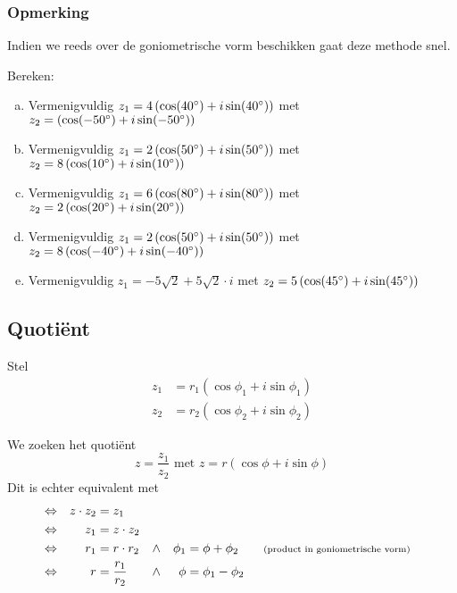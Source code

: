 \documentclass[12pt,twoside,a4paper]{article}
\begin{document}
\subsubsection*{Opmerking}

Indien we reeds over de goniometrische vorm beschikken gaat deze methode snel.

\begin{oefening}
Bereken:
\begin{enumerate}[(a)]
  \itemsep.5em
  \item Vermenigvuldig $z_1=4\left(\cos(40^\circ)+i\sin(40^\circ)\right)$ met $z_2=\left(\cos(-50^\circ)+i\sin(-50^\circ)\right)$
  \item Vermenigvuldig $z_1=2\left(\cos(50^\circ)+i\sin(50^\circ)\right)$ met $z_2=8\left(\cos(10^\circ)+i\sin(10^\circ)\right)$
  \item Vermenigvuldig $z_1=6\left(\cos(80^\circ)+i\sin(80^\circ)\right)$ met $z_2=2\left(\cos(20^\circ)+i\sin(20^\circ)\right)$
  \item Vermenigvuldig $z_1=2\left(\cos(50^\circ)+i\sin(50^\circ)\right)$ met $z_2=8\left(\cos(-40^\circ)+i\sin(-40^\circ)\right)$
  \item Vermenigvuldig $z_1=-5\sqrt{2}+5\sqrt{2} \cdot i$ met $z_2=5\left(\cos(45^\circ)+i\sin(45^\circ)\right)$
\end{enumerate}
\end{oefening}

\subsection{Quotiënt}

Stel
\begin{align*}
  z_1 &= r_1 ( \cos \phi_1 + i \sin \phi_1 )\\
  z_2 &= r_2 ( \cos \phi_2 + i \sin \phi_2 )
\end{align*}

We zoeken het quotiënt
\[z=\dfrac{z_1}{z_2} \mbox{ met } z=r(\cos \phi + i\sin \phi)\]
Dit is echter equivalent met
\begin{align*}
  &\Leftrightarrow& z \cdot z_2 &= z_1\\
  &\Leftrightarrow& z_1 &= z \cdot z_2\\
  &\Leftrightarrow& r_1 &= r \cdot r_2          &\wedge&&  \phi_1 &= \phi + \phi_2 \qquad \mbox{\scriptsize(product in goniometrische vorm)}\\
  &\Leftrightarrow&   r &= \dfrac{r_1}{r_2} &\wedge&&  \phi &= \phi_1 - \phi_2\\
\end{align*}
\end{document}
